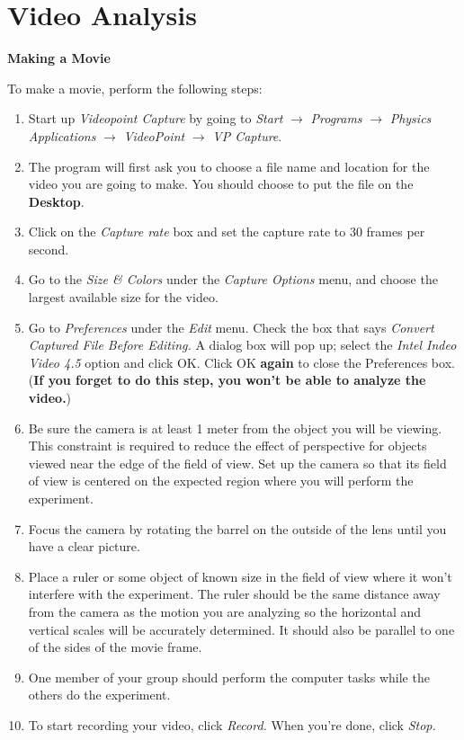 
\section{Video Analysis}

\textbf{Making a Movie} 

To make a movie, perform the following steps:

\begin{enumerate}
\item Start up \textit{Videopoint Capture} by
going to \textit{Start} $\rightarrow$ \textit{Programs} $\rightarrow$
\textit{Physics Applications} $\rightarrow$ \textit{VideoPoint}
$\rightarrow$ \textit{VP Capture}.
\item The program will first ask you to choose a file name and location for 
the video you are going to make.  You should choose to put the file on the 
\textbf{Desktop}.

\item Click on the \textit{Capture rate}
box and set the capture rate to 30 frames per second.
\item Go to the \textit{Size \& Colors} under the \textit{Capture Options} 
menu, and choose the largest available size for the video.

\item Go to \textit{Preferences} under the \textit{Edit} menu.  Check the box
that says \textit{Convert Captured File Before Editing.}  A dialog box will
pop up; select the \textit{Intel Indeo Video 4.5} option and
click OK.  Click OK \textbf{again} to close the Preferences box.
(\textbf{If you forget to do this step, you won't be able to analyze
the video.})


\item Be sure the camera is at least 1 meter from the object
you will be viewing. This constraint is required to reduce the effect
of perspective for objects viewed near the edge of the field of view.
Set up the camera so that its field of view is centered on the expected
region where you will perform the experiment. 
\item Focus the camera by rotating the barrel on the outside
of the lens until you have a clear picture.
\item Place a ruler or some
object of known size in the field of view where it won't interfere
with the experiment. The ruler should be the same distance away from
the camera as the motion you are analyzing so the horizontal and vertical 
scales will be accurately determined. It should also be parallel to one of the
sides of the movie frame.
\item One member of your group should perform the computer tasks while the
others do the experiment. 
\item To start recording your video, click \textit{Record.}  When
you're done, click \textit{Stop.}


\end{enumerate}
